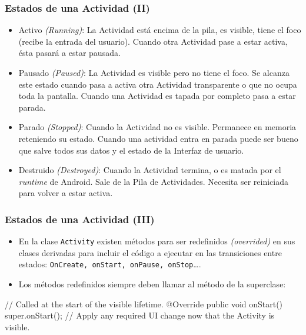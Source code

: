 \documentclass[hyperref={pdfpagelabels=true},ucs]{beamer}
\begin{document}
\begin{frame}
\frametitle{Estados de una Actividad (II)}

\begin{itemize}
\item \alert{Activo \emph{(Running)}}: La Actividad está encima de la
  pila, es visible, tiene el foco (recibe la entrada del
  usuario). Cuando otra Actividad pase a estar activa, ésta pasará a
  estar pausada.
\item \alert{Pausado \emph{(Paused)}}: La Actividad es visible pero no
  tiene el foco. Se alcanza este estado cuando pasa a activa otra
  Actividad transparente o que no ocupa toda la pantalla. Cuando una
  Actividad es tapada por completo pasa a estar parada.
\item \alert{Parado \emph{(Stopped)}}: Cuando la Actividad no es
  visible. Permanece en memoria reteniendo su estado. Cuando una
  actividad entra en parada puede ser bueno que salve todos sus datos y
  el estado de la Interfaz de usuario.
\item \alert{Destruido \emph{(Destroyed)}}: Cuando la Actividad
    termina, o es matada por el \emph{runtime} de Android. Sale
    de la Pila de Actividades. Necesita ser reiniciada para volver a
    estar activa.
\end{itemize}


\end{frame}



\begin{frame}[fragile]
\frametitle{Estados de una Actividad (III)}

\begin{itemize}
\item En la clase \verb|Activity| existen métodos para ser redefinidos
  \emph{(overrided)} en sus clases derivadas para incluir el código a
  ejecutar en las transiciones entre estados:
  \verb|OnCreate, onStart, onPause, onStop|\ldots.
\item Los métodos redefinidos siempre deben llamar al método de la
  superclase:
\end{itemize}

\begin{tiny}
\begin{block}{}
\begin{java}
// Called at the start of the visible lifetime.
@Override
public void onStart(){
  super.onStart();
  // Apply any required UI change now that the Activity is visible.
}    
\end{java}
\end{block}
\end{tiny}

\end{frame}
\end{document}

